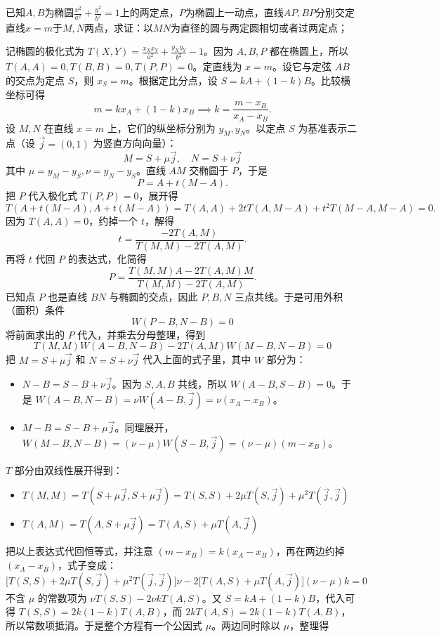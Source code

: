 \begin{exercise}
已知$A,B$为椭圆$\frac{x^{2}}{a^{2}}+\frac{y^{2}}{b^{2}}=1$上的两定点，$P$为椭圆上一动点，直线$AP,BP$分别交定直线$x=m$于$M,N$两点，求证：以$MN$为直径的圆与两定圆相切或者过两定点；
\end{exercise}
\begin{solution}
记椭圆的极化式为 $T(X,Y) = \frac{x_X x_Y}{a^2} + \frac{y_X y_Y}{b^2} - 1$。因为 $A,B,P$ 都在椭圆上，所以 $T(A,A)=0, T(B,B)=0, T(P,P)=0$。定直线为 $x=m$。设它与定弦 $AB$ 的交点为定点 $S$，则 $x_S = m$。根据定比分点，设 $S = kA + (1-k)B$。比较横坐标可得
$$m = k x_A + (1-k)x_B \implies k = \frac{m-x_B}{x_A-x_B}.$$
设 $M,N$ 在直线 $x=m$ 上，它们的纵坐标分别为 $y_M,y_N$。以定点 $S$ 为基准表示二点（设 $\vec{j} = (0,1)$ 为竖直方向向量）：
$$M = S + \mu \vec{j}, \quad N = S + \nu \vec{j}$$
其中 $\mu = y_M - y_S, \nu = y_N - y_S$。直线 $AM$ 交椭圆于 $P$，于是
$$P = A + t(M-A).$$
把 $P$ 代入极化式 $T(P,P)=0$，展开得
$$T(A+t(M-A), A+t(M-A)) = T(A,A) + 2t T(A, M-A) + t^2 T(M-A, M-A) = 0.$$
因为 $T(A,A)=0$，约掉一个 $t$，解得
$$t = \frac{-2T(A,M)}{T(M,M) - 2T(A,M)}.$$
再将 $t$ 代回 $P$ 的表达式，化简得
$$P = \frac{T(M,M)A - 2T(A,M)M}{T(M,M) - 2T(A,M)}.$$
已知点 $P$ 也是直线 $BN$ 与椭圆的交点，因此 $P, B, N$ 三点共线。于是可用外积（面积）条件
$$W(P-B, N-B) = 0$$
将前面求出的 $P$ 代入，并乘去分母整理，得到
$$ T(M,M) W(A-B, N-B) - 2T(A,M) W(M-B, N-B) = 0 $$
把 $M = S + \mu \vec{j}$ 和 $N = S + \nu \vec{j}$ 代入上面的式子里，其中 $W$ 部分为：
\begin{itemize}
\item $N-B = S-B + \nu \vec{j}$。因为 $S, A, B$ 共线，所以 $W(A-B, S-B) = 0$。于是 $W(A-B, N-B) = \nu W(A-B, \vec{j}) = \nu(x_A - x_B)$。
\item $M-B = S-B + \mu \vec{j}$。同理展开，$W(M-B, N-B) = (\nu-\mu) W(S-B, \vec{j}) = (\nu-\mu)(m - x_B)$。
\end{itemize}
$T$ 部分由双线性展开得到：
\begin{itemize}
\item $T(M,M) = T(S+\mu\vec{j}, S+\mu\vec{j}) = T(S,S) + 2\mu T(S,\vec{j}) + \mu^2 T(\vec{j},\vec{j})$
\item $T(A,M) = T(A, S+\mu\vec{j}) = T(A,S) + \mu T(A,\vec{j})$
\end{itemize}
把以上表达式代回恒等式，并注意 $(m - x_B) = k(x_A - x_B)$，再在两边约掉 $(x_A - x_B)$，式子变成：
$$\big[T(S,S) + 2\mu T(S,\vec{j}) + \mu^2 T(\vec{j},\vec{j})\big] \nu - 2\big[T(A,S) + \mu T(A,\vec{j})\big] (\nu-\mu) k = 0$$
不含 $\mu$ 的常数项为 $\nu T(S,S) - 2\nu k T(A,S)$。又 $S = kA + (1-k)B$，代入可得 $T(S,S) = 2k(1-k)T(A,B)$，而 $2k T(A,S) = 2k(1-k)T(A,B)$，所以常数项抵消。于是整个方程有一个公因式 $\mu$。两边同时除以 $\mu$，整理得

\end{solution}
